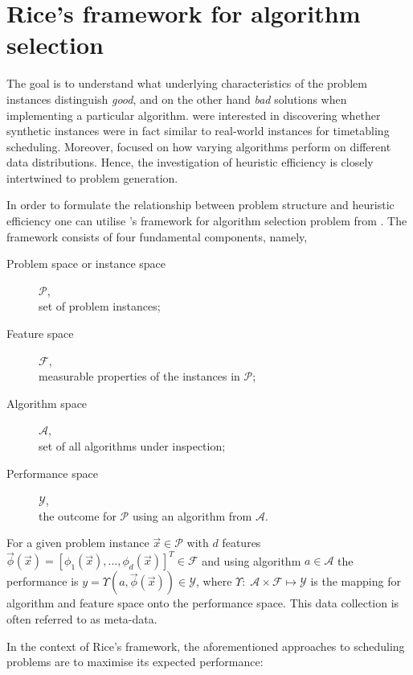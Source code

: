 \section{Rice's framework for algorithm selection}\label{sec:rice}
The goal is to understand what underlying characteristics of the problem 
instances distinguish \emph{good}, and on the other hand \emph{bad} solutions 
when implementing a particular algorithm. \citet{SmithMilesLion5} were 
interested in discovering whether synthetic instances were in fact similar to 
real-world instances for timetabling scheduling. Moreover,  
\citeauthor{SmithMilesLion5} focused on how varying algorithms perform 
on different data distributions. Hence, the investigation of heuristic 
efficiency is closely intertwined to problem generation. 

In order to formulate the relationship between problem structure and heuristic efficiency one can utilise \citeauthor{Rice76}'s framework for algorithm selection problem from \citeyear{Rice76}. The framework consists of four fundamental components, namely,
\begin{description}
	\item[Problem space or instance space] $\mathcal{P}$, \hfill\\
	set of problem instances; 
	\item[Feature space] $\mathcal{F}$, \hfill\\
	measurable properties of the instances in $\mathcal{P}$;
	\item[Algorithm space] $\mathcal{A}$, \hfill\\
	set of all algorithms under inspection;
	\item[Performance space] $\mathcal{Y}$, \hfill\\
	the outcome for $\mathcal{P}$ using an algorithm from $\mathcal{A}$.
\end{description}
For a given problem instance $\vec{x}\in\mathcal{P}$ with $d$ features 
$\vec{\phi}(\vec{x})=\left[\phi_1(\vec{x}),...,\phi_d( 
\vec{x})\right]^T\in\mathcal{F}$ and using algorithm $a\in\mathcal{A}$ the 
performance is $y=\Upsilon(a,\vec{\phi}(\vec{x}))\in\mathcal{Y}$, where 
$\Upsilon:\;\mathcal{A}\times\mathcal{F} \mapsto \mathcal{Y}$ is the mapping 
for algorithm and feature space onto the performance space. This data 
collection is often referred to as meta-data. 

In the context of Rice's framework, the aforementioned approaches to scheduling problems are to maximise its expected performance: 

